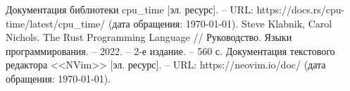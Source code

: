 \begin{thebibliography}{}
	 Документация библиотеки cpu\_time [эл. ресурс]. -- URL: https://docs.rs/cpu-time/latest/cpu\_time/ (дата обращения:  \today).
	 Steve Klabnik, Carol Nichols. The Rust Programming Language // Руководство. Языки программирования. -- 2022. -- 2-е издание. -- 560 с.
	 Документация текстового редактора <<NVim>> [эл. ресурс]. -- URL: https://neovim.io/doc/ (дата обращения:  \today).
\end{thebibliography}


